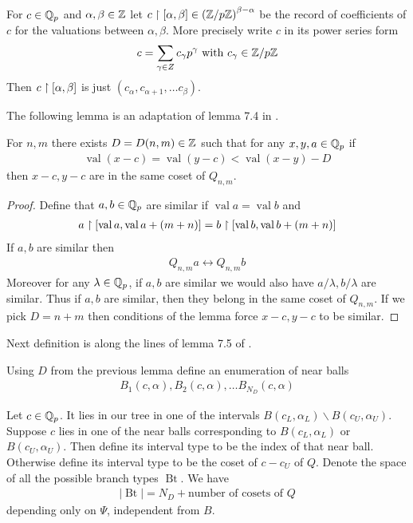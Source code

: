 \documentclass{amsart}
\newcommand{\paren}[1]{\left(#1\right)}
\DeclareMathOperator{\Bt}{Bt}
\DeclareMathOperator{\val}{val}
\begin{document}
\begin{Definition}
	For $c \in \mathbb{Q}_p$ and $\alpha, \beta \in \mathbb{Z}$ let $c \midr [\alpha, \beta] \in \paren{\Z/p\Z}^{\beta - \alpha}$ be the record of coefficients of $c$ for the valuations between $\alpha, \beta$.
	More precisely write $c$ in its power series form
	\begin{align*}
		c = \sum_{\gamma \in Z} c_\gamma p^\gamma \text{ with } c_\gamma \in \mathbb{Z}/p\mathbb{Z}
	\end{align*}
	Then $c \upharpoonright [\alpha, \beta]$ is just $(c_\alpha, c_{\alpha+1}, \ldots c_\beta)$.
\end{Definition}

The following lemma is an adaptation of lemma 7.4 in \cite{density}.

\begin{Lemma} \label{distance}
	For $n,m$ there exists $D = D(n,m) \in \mathbb{Z}$ such that for any $x,y,a \in \mathbb{Q}_p$ if
	\begin{align*}
		\val (x - c) = \val (y - c) < \val (x - y) - D
	\end{align*}
	then $x - c, y - c$ are in the same coset of $Q_{n,m}$.
\end{Lemma}
\begin{proof}
	Define that $a,b \in \mathbb{Q}_p$ are similar if $\val a = \val b$ and
	\begin{align*}
		a \midr [\val a, \val a + (m + n)] = b \midr [\val b, \val b + (m + n)]
	\end{align*}
	If $a,b$ are similar then
	\begin{align*}
		Q_{n,m} a \leftrightarrow Q_{n,m} b
	\end{align*}
	Moreover for any $\lambda \in \mathbb{Q}_p$, if $a,b$ are similar we would also have $a/\lambda, b/\lambda$ are similar.
	Thus if $a,b$ are similar, then they belong in the same coset of $Q_{n,m}$.
	If we pick $D = n + m$ then conditions of the lemma force $x - c, y - c$ to be similar.
\end{proof} 

Next definition is along the lines of lemma 7.5 of \cite{density}.

\begin{Definition}
	Using $D$ from the previous lemma define an enumeration of near balls
	\begin{align*}
		B_1(c, \alpha), B_2(c, \alpha), \ldots B_{N_D}(c, \alpha)
	\end{align*}
\end{Definition}

\begin{Definition}
	Let $c \in \mathbb{Q}_p$.
	It lies in our tree in one of the intervals $B(c_L, \alpha_L) \backslash B(c_U, \alpha_U)$.
	Suppose $c$ lies in one of the near balls corresponding to $B(c_L, \alpha_L)$ or $B(c_U, \alpha_U)$.
	Then define its interval type to be the index of that near ball.
	Otherwise define its interval type to be the coset of $c - c_U$ of $Q$.
	Denote the space of all the possible branch types $\Bt$.
	We have
	\begin{align*}
		|\Bt| = N_D + \text {number of cosets of $Q$}
	\end{align*}
	depending only on $\Psi$, independent from $B$.
	
\end{Definition}
\end{document}
